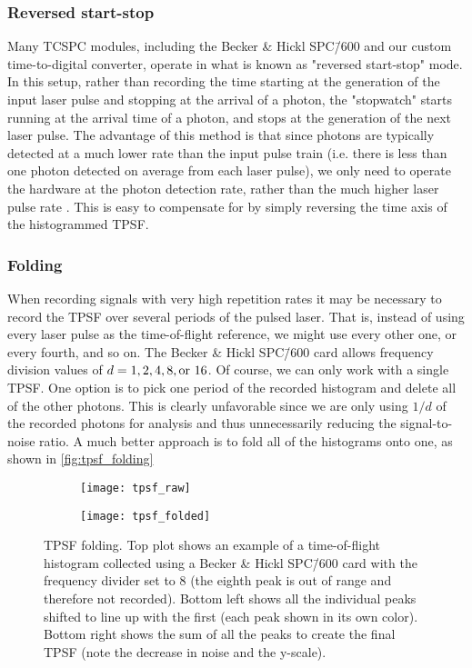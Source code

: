 \subsubsection{Reversed start-stop}
Many TCSPC modules, including the Becker \& Hickl SPC\=/600 and our custom time-to-digital converter, operate in what is known as "reversed start-stop" mode. In this setup, rather than recording the time starting at the generation of the input laser pulse and stopping at the arrival of a photon, the "stopwatch" starts running at the arrival time of a photon, and stops at the generation of the next laser pulse. The advantage of this method is that since photons are typically detected at a much lower rate than the input pulse train (i.e. there is less than one photon detected on average from each laser pulse), we only need to operate the hardware at the photon detection rate, rather than the much higher laser pulse rate \cite{Becker2014}. This is easy to compensate for by simply reversing the time axis of the histogrammed TPSF. 

\subsubsection{Folding}
When recording signals with very high repetition rates it may be necessary to record the TPSF over several periods of the pulsed laser. That is, instead of using every laser pulse as the time-of-flight reference, we might use every other one, or every fourth, and so on. The Becker \& Hickl SPC\=/600 card allows frequency division values of $d = 1,2,4,8, \textnormal{or } 16$. Of course, we can only work with a single TPSF. One option is to pick one period of the recorded histogram and delete all of the other photons. This is clearly unfavorable since we are only using $1/d$ of the recorded photons for analysis and thus unnecessarily reducing the signal-to-noise ratio. A much better approach is to fold all of the histograms onto one, as shown in \autoref{fig:tpsf_folding}

\begin{figure}[tb]
    \centering
    \begin{subfigure}{\textwidth}
        \texttt{[image: tpsf\_raw]}
    \end{subfigure}    
    \begin{subfigure}{\textwidth}
        \texttt{[image: tpsf\_folded]}
    \end{subfigure}
    \caption{TPSF folding. Top plot shows an example of a time-of-flight histogram collected using a Becker \& Hickl SPC\=/600 card with the frequency divider set to 8 (the eighth peak is out of range and therefore not recorded). Bottom left shows all the individual peaks shifted to line up with the first (each peak shown in its own color). Bottom right shows the sum of all the peaks to create the final TPSF (note the decrease in noise and the y-scale).}
    \label{fig:tpsf_folding}
\end{figure}

